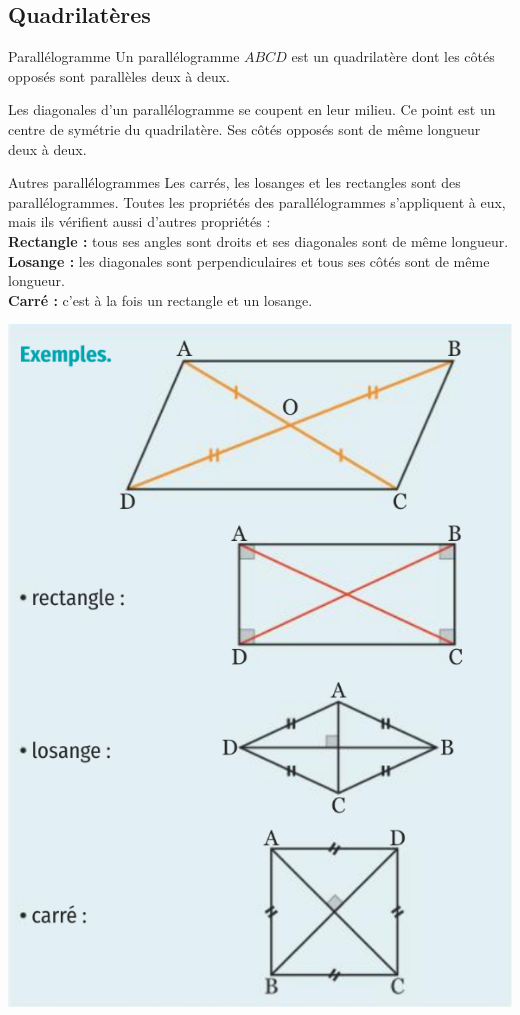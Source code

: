 \documentclass[11pt]{article}
\begin{document}
\subsection{Quadrilatères}
\noindent\begin{minipage}{.5\textwidth}
  \begin{defi}{Parallélogramme}
    Un parallélogramme $ABCD$ est un quadrilatère dont les côtés opposés sont
    parallèles deux à deux.
  \end{defi}
  \begin{prop}
    Les diagonales d'un parallélogramme se coupent en leur milieu. Ce point est
    un centre de symétrie du quadrilatère. Ses côtés opposés sont de même
    longueur deux à deux.
  \end{prop}
  \begin{defi}{Autres parallélogrammes}
    Les carrés, les losanges et les rectangles sont des parallélogrammes. Toutes
    les propriétés des parallélogrammes s'appliquent à eux, mais ils vérifient
    aussi d'autres propriétés :\\
    \textbf{Rectangle :} tous ses angles sont droits et ses diagonales sont de
    même longueur.\\
    \textbf{Losange :} les diagonales sont perpendiculaires et tous ses côtés
    sont de même longueur.\\
    \textbf{Carré :} c'est à la fois un rectangle et un losange.
  \end{defi}
\end{minipage}
\begin{minipage}{.5\textwidth}
\includegraphics[scale=.4]{quadri.png}
\end{minipage}
\end{document}

